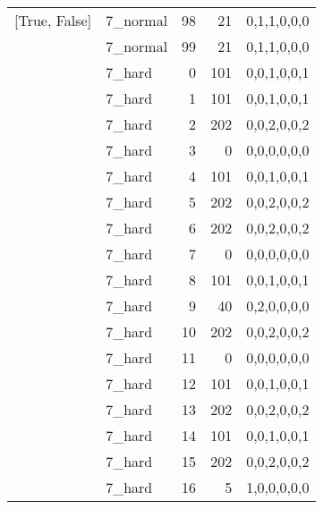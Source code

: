 \begin{tabular}{llrrl}
 [True, False]   & 7\_normal            &            98 &                    21 & 0,1,1,0,0,0   \\
 [True, False]   & 7\_normal            &            99 &                    21 & 0,1,1,0,0,0   \\
 [True, False]   & 7\_hard              &             0 &                   101 & 0,0,1,0,0,1   \\
 [True, False]   & 7\_hard              &             1 &                   101 & 0,0,1,0,0,1   \\
 [True, False]   & 7\_hard              &             2 &                   202 & 0,0,2,0,0,2   \\
 [True, False]   & 7\_hard              &             3 &                     0 & 0,0,0,0,0,0   \\
 [True, False]   & 7\_hard              &             4 &                   101 & 0,0,1,0,0,1   \\
 [True, False]   & 7\_hard              &             5 &                   202 & 0,0,2,0,0,2   \\
 [True, False]   & 7\_hard              &             6 &                   202 & 0,0,2,0,0,2   \\
 [True, False]   & 7\_hard              &             7 &                     0 & 0,0,0,0,0,0   \\
 [True, False]   & 7\_hard              &             8 &                   101 & 0,0,1,0,0,1   \\
 [True, False]   & 7\_hard              &             9 &                    40 & 0,2,0,0,0,0   \\
 [True, False]   & 7\_hard              &            10 &                   202 & 0,0,2,0,0,2   \\
 [True, False]   & 7\_hard              &            11 &                     0 & 0,0,0,0,0,0   \\
 [True, False]   & 7\_hard              &            12 &                   101 & 0,0,1,0,0,1   \\
 [True, False]   & 7\_hard              &            13 &                   202 & 0,0,2,0,0,2   \\
 [True, False]   & 7\_hard              &            14 &                   101 & 0,0,1,0,0,1   \\
 [True, False]   & 7\_hard              &            15 &                   202 & 0,0,2,0,0,2   \\
 [True, False]   & 7\_hard              &            16 &                     5 & 1,0,0,0,0,0   \\

\end{tabular}
